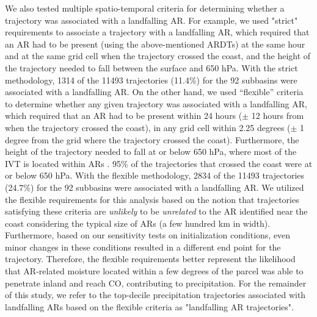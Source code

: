 \documentclass[draft]{agujournal2019}
\begin{document}

We also tested multiple spatio-temporal criteria for determining whether a trajectory was associated with a landfalling AR. For example, we used "strict" requirements to associate a trajectory with a landfalling AR, which required that an AR had to be present (using the above-mentioned ARDTs) at the same hour and at the same grid cell when the trajectory crossed the coast, and the height of the trajectory needed to fall between the surface and 650 hPa. With the strict methodology, 1314 of the 11493 trajectories (11.4\%) for the 92 subbasins were associated with a landfalling AR. On the other hand, we used “flexible” criteria to determine whether any given trajectory was associated with a landfalling AR, which required that an AR had to be present within 24 hours ($\pm$ 12 hours from when the trajectory crossed the coast), in any grid cell within 2.25 degrees ($\pm$ 1 degree from the grid where the trajectory crossed the coast). Furthermore, the height of the trajectory needed to fall at or below 650 hPa, where most of the IVT is located within ARs \cite{Guan2015}. 95\% of the trajectories that crossed the coast were at or below 650 hPa. With the flexible methodology, 2834 of the 11493 trajectories (24.7\%) for the 92 subbasins were associated with a landfalling AR. We utilized the flexible requirements for this analysis based on the notion that trajectories satisfying these criteria are \textit{unlikely} to be \textit{unrelated} to the AR identified near the coast considering the typical size of ARs (a few hundred km in width). Furthermore, based on our sensitivity tests on initialization conditions, even minor changes in these conditions resulted in a different end point for the trajectory. Therefore, the flexible requirements better represent the likelihood that AR-related moisture located within a few degrees of the parcel was able to penetrate inland and reach CO, contributing to precipitation. For the remainder of this study, we refer to the top-decile precipitation trajectories associated with landfalling ARs based on the flexible criteria as "landfalling AR trajectories". 
\end{document}
